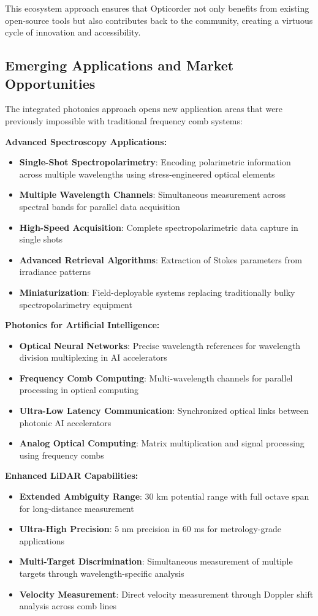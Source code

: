 \documentclass[11pt,a4paper]{article}
\begin{document}
This ecosystem approach ensures that Opticorder not only benefits from existing open-source tools but also contributes back to the community, creating a virtuous cycle of innovation and accessibility.

\subsection{Emerging Applications and Market Opportunities}
The integrated photonics approach opens new application areas that were previously impossible with traditional frequency comb systems:

\textbf{Advanced Spectroscopy Applications:}
\begin{itemize}
\item \textbf{Single-Shot Spectropolarimetry}: Encoding polarimetric information across multiple wavelengths using stress-engineered optical elements
\item \textbf{Multiple Wavelength Channels}: Simultaneous measurement across spectral bands for parallel data acquisition
\item \textbf{High-Speed Acquisition}: Complete spectropolarimetric data capture in single shots
\item \textbf{Advanced Retrieval Algorithms}: Extraction of Stokes parameters from irradiance patterns
\item \textbf{Miniaturization}: Field-deployable systems replacing traditionally bulky spectropolarimetry equipment
\end{itemize}

\textbf{Photonics for Artificial Intelligence:}
\begin{itemize}
\item \textbf{Optical Neural Networks}: Precise wavelength references for wavelength division multiplexing in AI accelerators
\item \textbf{Frequency Comb Computing}: Multi-wavelength channels for parallel processing in optical computing
\item \textbf{Ultra-Low Latency Communication}: Synchronized optical links between photonic AI accelerators
\item \textbf{Analog Optical Computing}: Matrix multiplication and signal processing using frequency combs
\end{itemize}

\textbf{Enhanced LiDAR Capabilities:}
\begin{itemize}
\item \textbf{Extended Ambiguity Range}: 30 km potential range with full octave span for long-distance measurement
\item \textbf{Ultra-High Precision}: 5 nm precision in 60 ms for metrology-grade applications
\item \textbf{Multi-Target Discrimination}: Simultaneous measurement of multiple targets through wavelength-specific analysis
\item \textbf{Velocity Measurement}: Direct velocity measurement through Doppler shift analysis across comb lines
\end{itemize}
\end{document}
